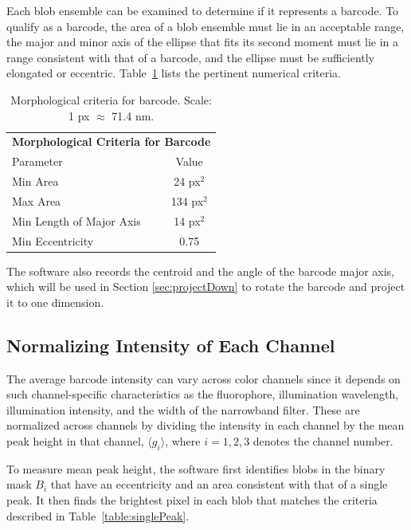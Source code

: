 Each blob ensemble can be examined to determine if it represents a barcode. To qualify as a barcode, the area of a blob ensemble must lie in an acceptable range, the major and minor axis of the ellipse that fits its second moment must lie in a range consistent with that of a barcode, and the ellipse must be sufficiently elongated or eccentric. Table~\ref{table:morphCriteria} lists the pertinent numerical criteria. 

\begin{table}[htbp] 
\begin{center}
\begin{tabular}{l c}
\multicolumn{2}{c}{\textbf{Morphological Criteria for Barcode}}\\
Parameter & Value \\
\hline
Min Area & 24 px$^2$ \\
Max Area & 134 px$^2$ \\
Min Length of Major Axis  & 14 px$^2$ \\
Min Eccentricity &0.75\\
\hline
\end{tabular}
\end{center}
\caption{Morphological criteria for barcode. Scale: 1 px $\approx$ 71.4 nm.\label{table:morphCriteria}}
\end{table}
The software also records the centroid and the angle of the barcode major axis, which will be used in Section \ref{sec:projectDown} to rotate the barcode and project it to one dimension. 

\subsection{Normalizing Intensity of Each Channel}\label{sec:normalizePeakHeight}
The average barcode intensity can vary across color channels since it depends on such channel-specific characteristics as the fluorophore, illumination wavelength, illumination intensity, and the width of the narrowband filter. These are normalized across channels by dividing the intensity in each channel by the mean peak height in that channel,  $\langle g_i \rangle$, where $i=1,2,3$ denotes the channel number. 

To measure mean peak height, the software first identifies blobs in the binary mask $B_i$ that have an eccentricity and an area consistent with that of a single peak. It then finds the brightest pixel in each blob that matches the criteria described in Table~\ref{table:singlePeak}.

